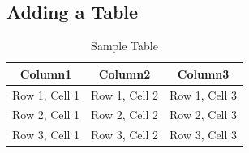\documentclass[11pt]{article}
\begin{document}
\subsection{\large Adding a Table}
\begin{table}[ht]
    \centering
    \begin{tabular}{|c|c|c|} \hline 
         \textbf{Column1} & \textbf{Column2} & \textbf{Column3} \\
        \hline
        Row 1, Cell 1 & Row 1, Cell 2 & Row 1, Cell 3 \\
        \hline
        Row 2, Cell 1 & Row 2, Cell 2 & Row 2, Cell 3 \\
        \hline
        Row 3, Cell 1 & Row 3, Cell 2 & Row 3, Cell 3 \\
        \hline
    \end{tabular}
    \caption{Sample Table}
    \label{tab:my_label}
\end{table}
\end{document}
